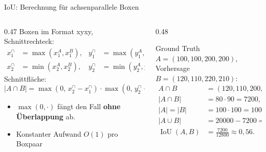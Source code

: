 \begin{frame}{IoU: Berechnung für achsenparallele Boxen}
\footnotesize
{}
\begin{columns}
\begin{column}{0.47\textwidth}
Boxen im Format xyxy, Schnittrechteck:
\begin{align*}
x_1^{\cap} &= \max(x_1^A, x_1^B), & y_1^{\cap} &= \max(y_1^A, y_1^B), \\
x_2^{\cap} &= \min(x_2^A, x_2^B), & y_2^{\cap} &= \min(y_2^A, y_2^B).
\end{align*}
Schnittfläche:
\[
|A \cap B| = \max(0,\, x_2^{\cap} - x_1^{\cap}) \cdot \max(0,\, y_2^{\cap} - y_1^{\cap})
\]
\begin{itemize}
  \item $\max(0, \cdot)$ fängt den Fall \textbf{ohne Überlappung} ab.
  \item Konstanter Aufwand $O(1)$ pro Boxpaar
\end{itemize}
\end{column}
\begin{column}{0.48\textwidth}
\begin{beispiel}
Ground Truth $A = (100, 100, 200, 200)$, \\
Vorhersage $B = (120, 110, 220, 210)$:
\begin{align*}
A \cap B &= (120, 110, 200, 200), \\
|A \cap B| &= 80 \cdot 90 = \num{7200}, \\
|A| = |B| &= 100 \cdot 100 = \num{10000}, \\
|A \cup B| &= \num{20000} - \num{7200} = \num{12800}, \\
\operatorname{IoU}(A, B) &= \tfrac{\num{7200}}{\num{12800}} \approx 0{,}56.
\end{align*}
\end{beispiel}
\end{column}
\end{columns}
\end{frame}

